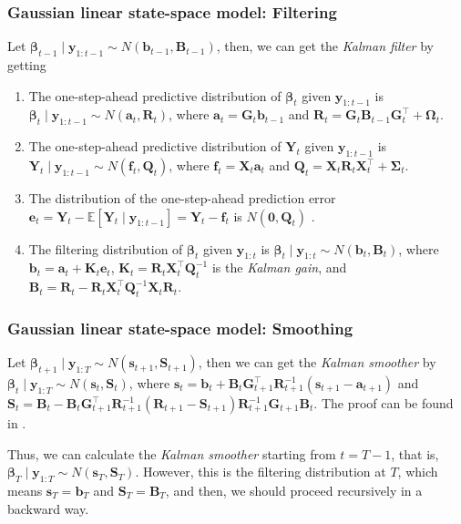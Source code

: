 \documentclass[12pt, compress]{beamer}
\begin{document}
\begin{frame}
	\frametitle{Gaussian linear state-space model: Filtering}
Let $\bm{\beta}_{t-1}\mid \bm{y}_{1:t-1}\sim N(\bm{b}_{t-1},\bm{B}_{t-1})$, then, we can get the \textit{Kalman filter} by getting
\begin{enumerate}
	\item The one-step-ahead predictive distribution of $\bm{\beta}_t$ given $\bm{y}_{1:t-1}$ is $\bm{\beta}_t\mid \bm{y}_{1:t-1}\sim N(\bm{a}_t, \bm{R}_t)$, where $\bm{a}_t=\bm{G}_t\bm{b}_{t-1}$ and $\bm{R}_t=\bm{G}_t\bm{B}_{t-1}\bm{G}_t^{\top}+\bm{\Omega}_t$.
	\item  The one-step-ahead predictive distribution of $\bm{Y}_t$ given $\bm{y}_{1:t-1}$ is $\bm{Y}_t\mid \bm{y}_{1:t-1}\sim N(\bm{f}_t, \bm{Q}_t)$, where $\bm{f}_t=\bm{X}_t\bm{a}_t$ and $\bm{Q}_t=\bm{X}_t\bm{R}_t\bm{X}_t^{\top}+\bm{\Sigma}_t$.
	\item The distribution of the one-step-ahead prediction error  $\bm{e}_t=\bm{Y}_t-\mathbb{E}[\bm{Y}_t\mid \bm{y}_{1:t-1}]=\bm{Y}_t-\bm{f}_t$ is $N(\bm{0}, \bm{Q}_t)$ \cite[Chap.~6]{shumway2017time}. 
	\item The filtering distribution of $\bm{\beta}_t$ given $\bm{y}_{1:t}$ is $\bm{\beta}_t\mid \bm{y}_{1:t}\sim N(\bm{b}_t, \bm{B}_t)$, where $\bm{b}_t=\bm{a}_t+\bm{K}_t\bm{e}_t$, $\bm{K}_t=\bm{R}_t\bm{X}_t^{\top}\bm{Q}_t^{-1}$ is the \textit{Kalman gain}, and $\bm{B}_t=\bm{R}_t-\bm{R}_t\bm{X}_t^{\top}\bm{Q}_t^{-1}\bm{X}_t\bm{R}_t$.   
\end{enumerate}    

\end{frame}

\begin{frame}
	\frametitle{Gaussian linear state-space model: Smoothing}
Let $\bm{\beta}_{t+1}\mid \bm{y}_{1:T}\sim N(\bm{s}_{t+1},\bm{S}_{t+1})$, then we can get the \textit{Kalman smoother} by $\bm{\beta}_{t}\mid \bm{y}_{1:T}\sim N(\bm{s}_{t},\bm{S}_{t})$, where $\bm{s}_t=\bm{b}_t+\bm{B}_t\bm{G}_{t+1}^{\top}\bm{R}_{t+1}^{-1}(\bm{s}_{t+1}-\bm{a}_{t+1})$ and $\bm{S}_t=\bm{B}_t-\bm{B}_t\bm{G}_{t+1}^{\top}\bm{R}_{t+1}^{-1}(\bm{R}_{t+1}-\bm{S}_{t+1})\bm{R}_{t+1}^{-1}\bm{G}_{t+1}\bm{B}_{t}$. The proof can be found in \cite[Chap~2]{petris2009dynamic}. 

Thus, we can calculate the \textit{Kalman smoother} starting from $t=T-1$, that is, $\bm{\beta}_{T}\mid \bm{y}_{1:T}\sim N(\bm{s}_{T},\bm{S}_{T})$. However, this is the filtering distribution at $T$, which means $\bm{s}_{T}=\bm{b}_{T}$ and $\bm{S}_{T}=\bm{B}_{T}$, and then, we should proceed recursively in a backward way.
\end{frame}
\end{document}
